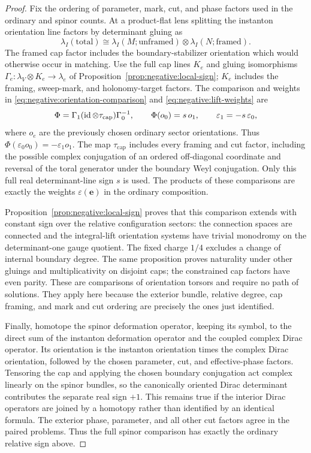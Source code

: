\begin{proof}
Fix the ordering of parameter, mark, cut, and phase factors used
in the ordinary and spinor counts.  At a product-flat lens
splitting the instanton orientation line factors by determinant
gluing as
\begin{equation}
 \lambda_I(\mathrm{total})
 \cong \lambda_I(M;\mathrm{unframed})
       \otimes\lambda_I(N;\mathrm{framed}).
 \label{eq:gluing:excision}
\end{equation}
The framed cap factor includes the boundary-stabilizer orientation
which would otherwise occur in matching.  Use the full cap lines
$K_e$ and gluing isomorphisms
$\Gamma_e:\lambda_V\otimes K_e\longrightarrow\lambda_e$
of Proposition~\ref{prop:negative:local-sign}; $K_e$ includes the
framing, sweep-mark, and holonomy-target factors.  The comparison
and weights in \eqref{eq:negative:orientation-comparison} and
\eqref{eq:negative:lift-weights} are
\[
 \Phi=\Gamma_1(\operatorname{id}\otimes\tau_{\mathrm{cap}})\Gamma_0^{-1},
 \qquad \Phi(o_0)=s\,o_1,
 \qquad \varepsilon_1=-s\,\varepsilon_0,
\]
where $o_e$ are the previously chosen ordinary sector orientations.
Thus $\Phi(\varepsilon_0o_0)=-\varepsilon_1o_1$.
The map $\tau_{\mathrm{cap}}$ includes every framing and cut factor,
including the possible complex conjugation of an ordered
off-diagonal coordinate and reversal of the toral generator under
the boundary Weyl conjugation.  Only this full real determinant-line
sign $s$ is used.  The products of these comparisons are exactly
the weights $\varepsilon(\mathbf e)$ in the ordinary composition.

Proposition~\ref{prop:negative:local-sign} proves that this comparison
extends with constant sign over the relative configuration sectors:
the connection spaces are connected and the integral-lift orientation
systems have trivial monodromy on the determinant-one gauge quotient.
The fixed charge $1/4$ excludes a change of internal boundary degree.
The same proposition proves naturality under other gluings and
multiplicativity on disjoint caps; the constrained cap factors have
even parity.  These are comparisons of orientation torsors and require
no path of solutions.  They apply here because the exterior bundle,
relative degree, cap framing, and mark and cut ordering are precisely
the ones just identified.

Finally, homotope the spinor deformation operator, keeping its
symbol, to the direct sum of the instanton deformation operator
and the coupled complex Dirac operator.  Its orientation is the
instanton orientation times the complex Dirac orientation, followed
by the chosen parameter, cut, and effective-phase factors.
Tensoring the cap and applying the chosen boundary conjugation act
complex linearly on the spinor bundles, so the canonically oriented
Dirac determinant contributes the separate real sign $+1$.
This remains true if the interior Dirac operators are joined by a
homotopy rather than identified by an identical formula.  The exterior
phase, parameter, and all other cut factors agree in the paired
problems.  Thus the full spinor comparison has exactly the ordinary
relative sign above.


\end{proof}
